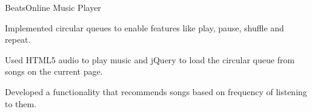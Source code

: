 \begin{rSubsection}{Beats}{\em }{Online Music Player}{}
    \item Implemented circular queues to enable features like play, pause, shuffle and repeat.
    \item Used HTML5 audio to play music and jQuery to load the circular queue from songs on the current page.
    \item Developed a functionality that recommends songs based on frequency of listening to them.
\end{rSubsection}